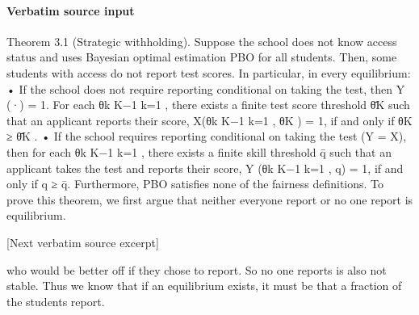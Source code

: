 \documentclass[10pt]{article}
\begin{document}
\paragraph{Verbatim source input}
\begin{ReviewVerbatim}
Theorem 3.1 (Strategic withholding). Suppose the school does not know access status and uses
Bayesian optimal estimation PBO for all students. Then, some students with access do not report
test scores. In particular, in every equilibrium:
• If the school does not require reporting conditional on taking the test, then Y (·) = 1. For each
{θk }K−1
k=1 , there exists a finite test score threshold θ̄K such that an applicant reports their score,
X({θk }K−1
k=1 , θK ) = 1, if and only if θK ≥ θ̄K .
• If the school requires reporting conditional on taking the test (Y = X), then for each {θk }K−1
k=1 ,
there exists a finite skill threshold q̄ such that an applicant takes the test and reports their
score, Y ({θk }K−1
k=1 , q) = 1, if and only if q ≥ q̄.
Furthermore, PBO satisfies none of the fairness definitions.
To prove this theorem, we ﬁrst argue that neither everyone report or no one report is equilibrium.

[Next verbatim source excerpt]

who would be better oﬀ if they chose to report. So no one reports is also not stable. Thus we know
that if an equilibrium exists, it must be that a fraction of the students report.
\end{ReviewVerbatim}
\end{document}
